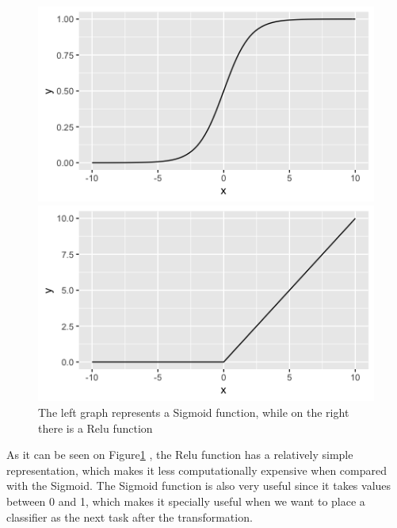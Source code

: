 \documentclass[12pt]{report}
\begin{document}
\begin{figure}[H]
	\begin{minipage}{.5\textwidth}
		\includegraphics[scale=.5]{Sigmoid_function}
	\end{minipage}%
	\begin{minipage}{.5\textwidth}
		\begin{flushright}
			\includegraphics[scale=.5]{Relu_function}  
		\end{flushright} 
	\end{minipage}  
	\caption{The left graph represents a Sigmoid function, while on the right there is a Relu function}
	\label{fig:fig3}
\end{figure}

As it can be seen on Figure\ref{fig:fig3} , the Relu function has a relatively simple representation, which makes it less computationally expensive when compared with the Sigmoid. The Sigmoid function is also very useful since it takes values between 0 and 1, which makes it specially useful when we want to place a classifier as the next task after the transformation.\par 
\end{document}
